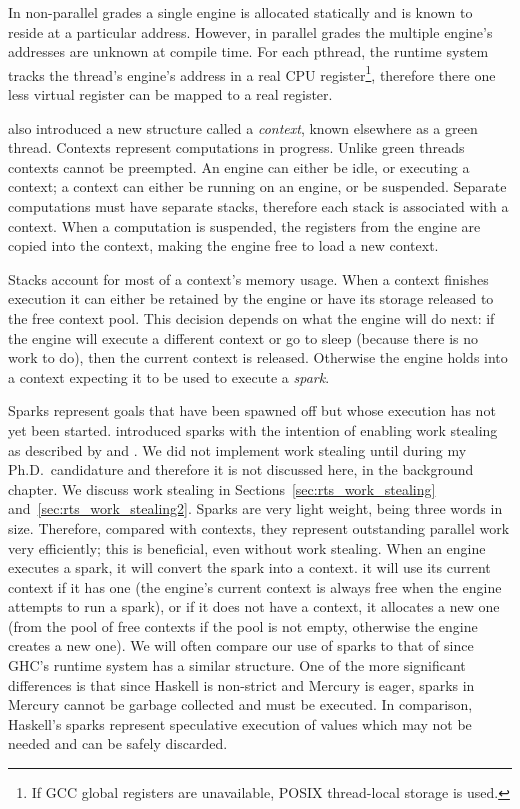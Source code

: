 In non-parallel grades a single engine is allocated statically and is known
to reside at a particular address.
However,
in parallel grades the multiple engine's addresses are unknown at compile
time.
For each pthread,
the runtime system tracks the thread's engine's address in a real CPU
register\footnote{
    If GCC global registers are unavailable,
    POSIX thread-local storage is used.
},
therefore there one less virtual register can be mapped to a real register.

\citet{conway:2002:par} also introduced a new structure called a
\emph{context}, known elsewhere as a green thread.
Contexts represent computations in progress.
Unlike green threads contexts cannot be preempted.
An engine can either be idle, or executing a context;
a context can either be running on an engine, or be suspended.
Separate computations must have separate stacks,
therefore each stack is associated with a context.
When a computation is suspended,
the registers from the engine are copied into the context,
making the engine free to load a new context.

Stacks account for most of a context's memory usage.
When a context finishes execution
it can either be retained by the engine or
have its storage released to the free context pool.
This decision depends on what the engine will do next:
if the engine will execute a different context or go to sleep
(because there is no work to do),
then the current context is released.
Otherwise the engine holds into a context expecting it to be used to execute
a \emph{spark}.

Sparks represent goals that have been spawned off
but whose execution has not yet been started.
\citet*{wang:2006:hons} introduced sparks with the intention of
enabling work stealing as described by
\citet*{blumofe:1994:work-stealing,halstead:1985:multilisp}
and \citet*{kranz:1989:mul-t_article}.
We did not implement work stealing until during my Ph.D.\ candidature
and therefore it is not discussed here, in the background chapter.
We discuss work stealing in Sections~\ref{sec:rts_work_stealing}
and~\ref{sec:rts_work_stealing2}.
Sparks are very light weight,
being three words in size.
Therefore, compared with contexts,
they represent outstanding parallel work very efficiently;
this is beneficial, even without work stealing.
When an engine executes a spark, it will convert the spark into a context.
it will use its current context if it has one
(the engine's current context is always free when the engine attempts to run
a spark),
or if it does not have a context,
it allocates a new one
(from the pool of free contexts if the pool is not empty,
otherwise the engine creates a new one).
We will often compare our use of sparks to that of
\citet*{simonmar_2009_multicore_rts} since GHC's runtime system has a
similar structure.
One of the more significant differences
is that since Haskell is non-strict and Mercury is eager,
sparks in Mercury cannot be garbage collected and must be executed.
In comparison,
Haskell's sparks represent speculative execution of values which may not be
needed and can be safely discarded.

